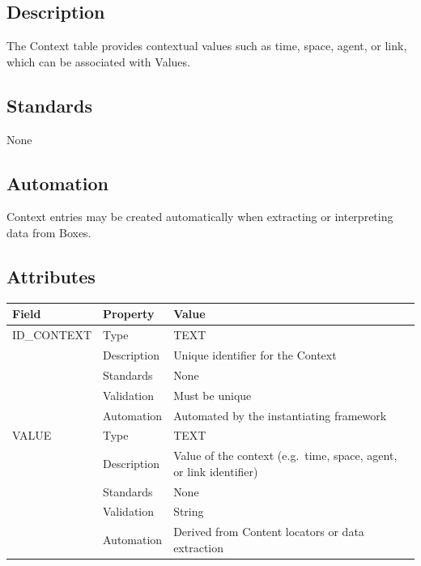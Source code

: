 \subsection{Description}\label{description-8}

The Context table provides contextual values such as time, space, agent,
or link, which can be associated with Values.

\subsection{Standards}\label{standards-10}

None

\subsection{Automation}\label{automation-10}

Context entries may be created automatically when extracting or
interpreting data from Boxes.

\subsection{Attributes}\label{attributes-10}

\begin{longtable}[]{@{}
  >{\raggedright\arraybackslash}p{}
  >{\raggedright\arraybackslash}p{}
  >{\raggedright\arraybackslash}p{}@{}}
\toprule\noalign{}
\begin{minipage}[b]{\linewidth}\raggedright
Field
\end{minipage} & \begin{minipage}[b]{\linewidth}\raggedright
Property
\end{minipage} & \begin{minipage}[b]{\linewidth}\raggedright
Value
\end{minipage} \\
\midrule\noalign{}
\endhead
\bottomrule\noalign{}
\endlastfoot
ID\_CONTEXT & Type & TEXT \\
& Description & Unique identifier for the Context \\
& Standards & None \\
& Validation & Must be unique \\
& Automation & Automated by the instantiating framework \\
VALUE & Type & TEXT \\
& Description & Value of the context (e.g.~time, space, agent, or link
identifier) \\
& Standards & None \\
& Validation & String \\
& Automation & Derived from Content locators or data extraction \\
\end{longtable}

